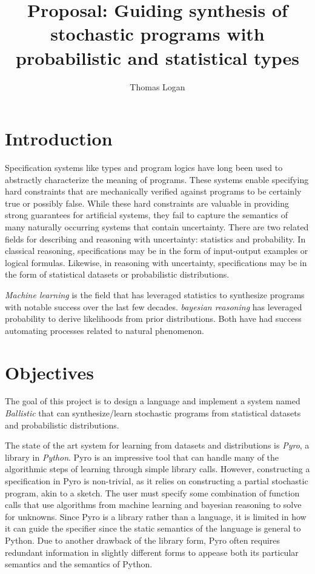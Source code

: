 \documentclass[runningheads]{llncs}
\title{Proposal: Guiding synthesis of stochastic programs with probabilistic and statistical types}
\author{Thomas Logan}
\institute{University of Texas at Austin}
\begin{document}
\maketitle

\section{Introduction}
Specification systems like types and program logics have long been used to abstractly characterize the meaning of programs.
These systems enable specifying hard constraints that are mechanically verified against programs to be certainly true or possibly false.
While these hard constraints are valuable in providing strong guarantees for artificial systems, 
they fail to capture the semantics of many naturally occurring systems that contain uncertainty.
There are two related fields for describing and reasoning with uncertainty: statistics and probability.
In classical reasoning, specifications may be in the form of input-output examples or logical formulas.   
Likewise, in reasoning with uncertainty, specifications may be in the form of statistical datasets or probabilistic distributions.


\emph{Machine learning} is the field that has leveraged statistics to synthesize programs 
with notable success over the last few decades.
\emph{bayesian reasoning} has leveraged probability to derive likelihoods from prior distributions.
Both have had success automating processes related to natural phenomenon.  


\section{Objectives}
The goal of this project is to design a language and implement a system named \emph{Ballistic} 
that can synthesize/learn stochastic programs from statistical datasets and probabilistic distributions.

The state of the art system for learning from datasets and distributions is \emph{Pyro}, a library in \emph{Python}. 
Pyro is an impressive tool that can handle many of the algorithmic steps of learning through simple library calls. 
However, constructing a specification in Pyro is non-trivial, as it relies on constructing 
a partial stochastic program, akin to a sketch. The user must specify some combination of function calls that use 
algorithms from machine learning and bayesian reasoning to solve for unknowns. 
Since Pyro is a library rather than a language, it is limited in how it can guide the specifier 
since the static semantics of the language is general to Python. 
Due to another drawback of the library form, Pyro often requires redundant information 
in slightly different forms to appease both its particular semantics and the semantics of Python. 
\end{document}

